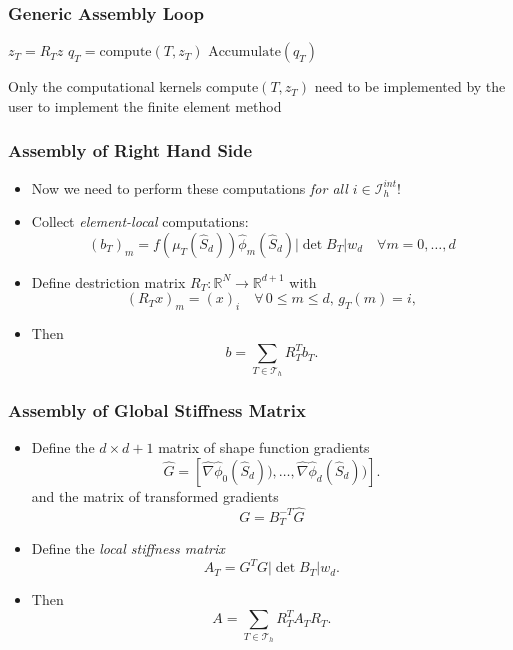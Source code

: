 \documentclass[aspectratio=169,11pt]{beamer}
\theoremstyle{definition}
\begin{document}
\begin{frame}
\frametitle{Generic Assembly Loop}
\begin{algorithmic}[1]
 
\State $z_T = R_T z$ 
\State $q_T=\text{compute}(T,z_T)$ 
\State $\text{Accumulate}(q_T)$ 
\EndFor
\end{algorithmic}
Only the computational kernels $\text{compute}(T,z_T)$ need to be implemented by the user
to implement the finite element method
\end{frame}

\begin{frame}
\frametitle{Assembly of Right Hand Side}
\begin{itemize}
\item Now we need to perform these computations {\em for all $i\in\mathcal{I}_h^{int}$}!
\item Collect {\em element-local} computations:
\begin{equation*}
(b_T)_m =  f(\mu_T(\hat S_d)) \hat\phi_m(\hat S_d) |\det B_T| w_d \quad \forall m=0,\ldots,d
\end{equation*}
\item Define {destriction matrix} $R_T : \mathbb{R}^N \to \mathbb{R}^{d+1}$ with
\begin{equation*}
(R_T x)_m = (x)_i \quad \forall \,0\leq m \leq d, \,g_T(m)=i,
\end{equation*}
\item Then
\begin{equation*}
b = \sum_{T\in\mathcal{T}_h} R_T^T b_T .
\end{equation*}
\end{itemize}
\end{frame}

\begin{frame}
\frametitle{Assembly of Global Stiffness Matrix}
\begin{itemize}
\item Define the $d\times d+1$ matrix of shape function gradients
\begin{equation*}
\hat G = \left[\hat\nabla\hat\phi_0(\hat S_d)),\ldots,\hat\nabla\hat\phi_d(\hat S_d))\right] .
\end{equation*}
and the matrix of transformed gradients $$G=B_T^{-T} \hat G$$
\item Define the {\em local stiffness matrix}
\begin{equation*}
A_T = G^T G |\det B_T| w_d .
\end{equation*}
\item Then
\begin{equation*}
A =  \sum_{T\in\mathcal{T}_h} R_T^T A_T R_T .
\end{equation*}
\end{itemize}
\end{frame}
\end{document}
